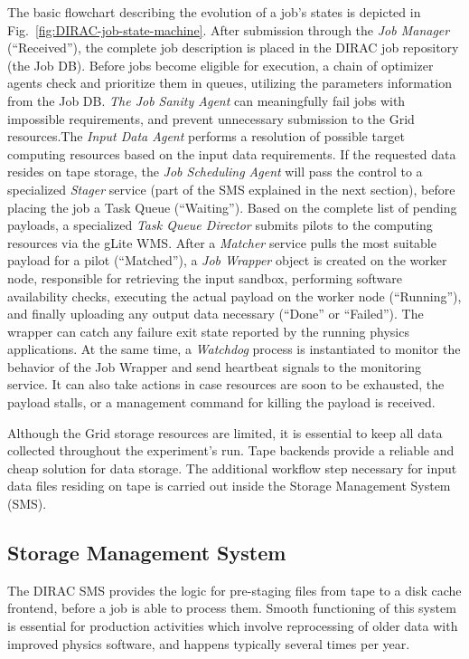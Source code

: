 \documentclass[10pt,conference]{IEEEtran}
\begin{document}
The basic flowchart describing the evolution of a job’s states is depicted in
Fig.~\ref{fig:DIRAC-job-state-machine}. After submission through the \textit{Job Manager} (“Received”), the complete
job description is placed in the DIRAC job repository (the Job DB). Before jobs
become eligible for execution, a chain of optimizer agents check and prioritize
them in queues, utilizing the parameters information from the Job DB. \textit{The Job
Sanity Agent} can meaningfully fail jobs with impossible requirements, and
prevent unnecessary submission to the Grid resources.The \textit{Input Data Agent}
performs a resolution of possible target computing resources based on the input
data requirements. If the requested data resides on tape storage, the \textit{Job
Scheduling Agent} will pass the control to a specialized \textit{Stager} service (part of
the SMS explained in the next section), before placing the job a Task Queue
(“Waiting”). Based on the complete list of pending payloads, a specialized \textit{Task
Queue Director} submits pilots to the computing resources via the gLite WMS. After
a \textit{Matcher} service pulls the most suitable payload for a pilot (“Matched”), a \textit{Job
Wrapper} object is created on the worker node, responsible for retrieving the
input sandbox, performing software availability checks, executing the actual
payload on the worker node (“Running”), and finally uploading any output data
necessary (“Done” or “Failed”). The wrapper can catch any failure exit state
reported by the running physics applications. At the same time, a \textit{Watchdog}
process is instantiated to monitor the behavior of the Job Wrapper and send
heartbeat signals to the monitoring service. It can also take actions in case
resources are soon to be exhausted, the payload stalls, or a management command
for killing the payload is received.

Although the Grid storage resources are limited, it is essential to keep all
data collected throughout the experiment’s run. Tape backends provide a reliable
and cheap solution for data storage. The additional workflow step 
necessary for input data files residing on tape is carried out inside the
Storage Management System (SMS).

\subsection{Storage Management System}

The DIRAC SMS provides the logic for pre-staging files from tape to a disk cache
frontend, before a job is able to process them. Smooth functioning of this
system is essential for production activities which involve reprocessing of
older data with improved physics software, and happens typically several times
per year.
\end{document}
